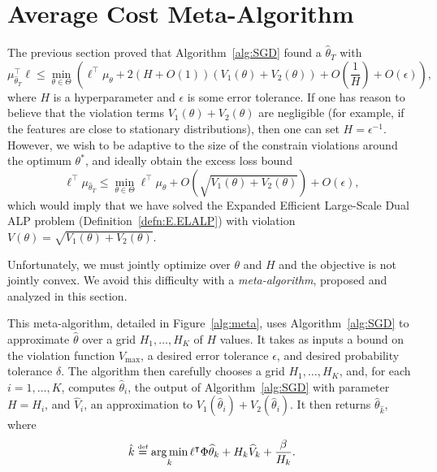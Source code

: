 \documentclass[11pt]{article}
\newcommand{\df}{\stackrel{\mbox{\rm\tiny def}}{=}}
\begin{document}
\section{Average Cost Meta-Algorithm}
\label{sec:finding_H}
The previous section proved that Algorithm~\ref{alg:SGD} found a $\widehat\theta_T$ with
\begin{equation*}
    \mu_{\widehat\theta_T}^\top \ell \le \min_{\theta\in\Theta} \left(
      \ell^\top\mu_\theta      
       +2\left(H+ O(1)\right)\left(V_1(\theta) + V_2(\theta)\right)
      + O\left(\frac{1}{H}\right)
      +O\left(\epsilon\right) \right),
\end{equation*}
where $H$ is a hyperparameter and $\epsilon$ is some error tolerance. If one has reason to believe that the violation terms $V_1(\theta) + V_2(\theta)$ are negligible (for example, if the features are close to stationary distributions), then one can set $H = \epsilon^{-1}$. However, we wish to be adaptive to the size of the constrain violations around the optimum $\theta^*$, and ideally obtain the excess loss bound 
\begin{equation*}
\ell^\top\mu_{\widehat\theta_T} \le \min_{\theta\in\Theta}  \ell^\top\mu_\theta +O\left( \sqrt{V_1(\theta) + V_2(\theta)}\right) + O(\epsilon),
\end{equation*}
which would imply that we have solved the Expanded Efficient Large-Scale Dual ALP problem (Definition~\ref{defn:E.ELALP}) with violation $V(\theta) = \sqrt{V_1(\theta) + V_2(\theta)}$.

Unfortunately, we must jointly optimize over $\theta$ and $H$ and the objective is not jointly convex. We avoid this difficulty with a \emph{meta-algorithm}, proposed and analyzed in this section.

This meta-algorithm, detailed in Figure~\ref{alg:meta}, uses Algorithm~\ref{alg:SGD} to approximate $\widehat \theta$ over a grid $H_1,\ldots,H_K$ of $H$ values. It takes as inputs a bound on the violation function $V_{\max}$, a desired error tolerance $\epsilon$, and desired probability tolerance $\delta$. The algorithm then carefully chooses a grid $H_1,\ldots, H_K$, and, for each $i=1,\ldots,K$, computes $\hat\theta_i$, the output of Algorithm~\ref{alg:SGD} with parameter $H= H_i$, and $\widehat V_i$, an approximation to $V_1(\hat\theta_i) + V_2(\hat\theta_i)$. It then returns $\hat\theta_{\hat k}$, where
\begin{equation*}
    \hat k \df \argmin_k \ell^\top\Phi\widehat\theta_k + H_k \widehat V_k + \frac{\beta}{H_k}.
\end{equation*}
\end{document}
